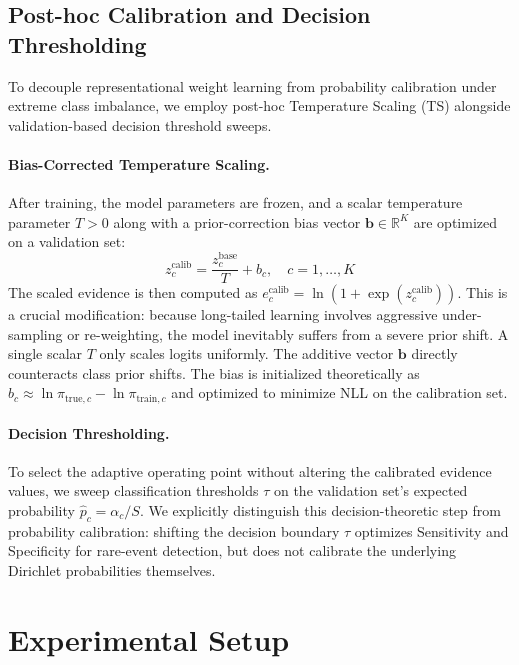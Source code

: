 \documentclass[letterpaper]{article} %
\newcommand{\R}{\mathbb{R}}
\begin{document}
\subsection{Post-hoc Calibration and Decision Thresholding}
To decouple representational weight learning from probability calibration under extreme class imbalance, we employ post-hoc Temperature Scaling (TS) \cite{guo2017calibration} alongside validation-based decision threshold sweeps. 

\paragraph{Bias-Corrected Temperature Scaling.} After training, the model parameters are frozen, and a scalar temperature parameter $T > 0$ along with a prior-correction bias vector $\bm{b} \in \R^K$ are optimized on a validation set:
\begin{equation}
    z^{\text{calib}}_c = \frac{z^{\text{base}}_c}{T} + b_c, \quad c = 1, \ldots, K
\end{equation}
The scaled evidence is then computed as $e^{\text{calib}}_c = \ln(1 + \exp(z^{\text{calib}}_c))$. This is a crucial modification: because long-tailed learning involves aggressive under-sampling or re-weighting, the model inevitably suffers from a severe prior shift. A single scalar $T$ only scales logits uniformly. The additive vector $\bm{b}$ directly counteracts class prior shifts. The bias is initialized theoretically as $b_c \approx \ln \pi_{\text{true},c} - \ln \pi_{\text{train},c}$ and optimized to minimize NLL on the calibration set.

\paragraph{Decision Thresholding.} To select the adaptive operating point without altering the calibrated evidence values, we sweep classification thresholds $\tau$ on the validation set's expected probability $\hat{p}_c = \alpha_c/S$. We explicitly distinguish this decision-theoretic step from probability calibration: shifting the decision boundary $\tau$ optimizes Sensitivity and Specificity for rare-event detection, but does not calibrate the underlying Dirichlet probabilities themselves.

\section{Experimental Setup}\label{sec:experiment}
\end{document}
